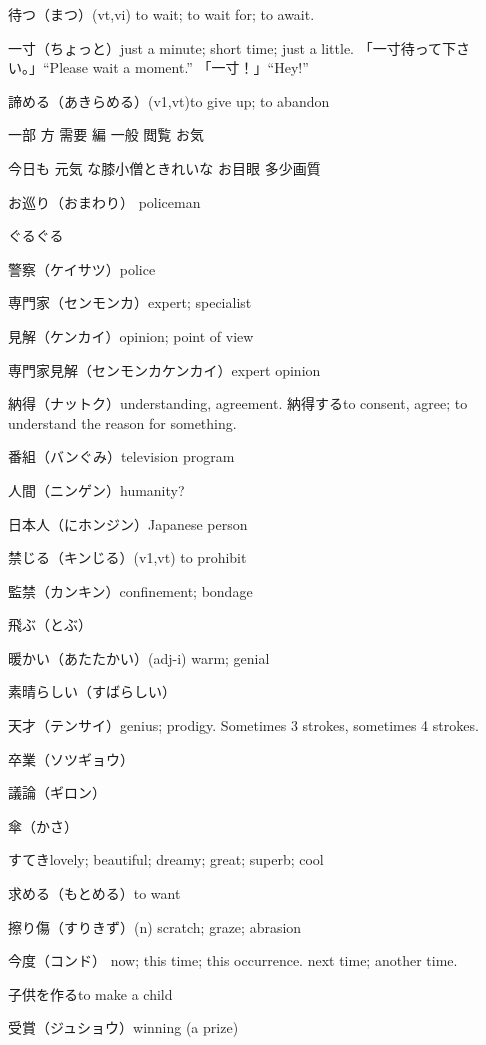 待つ（まつ）(vt,vi) to wait; to wait for; to await.

一寸（ちょっと）just a minute; short time; just a little.
「一寸待って下さい。」``Please wait a moment.''
「一寸！」``Hey!''

諦める（あきらめる）(v1,vt)to give up; to abandon

一部
方
需要
編
一般
閲覧
お気

今日も
元気
な膝小僧ときれいな
お目眼
多少画質

お巡り（おまわり）
policeman

ぐるぐる

警察（ケイサツ）police

専門家（センモンカ）expert; specialist

見解（ケンカイ）opinion; point of view

専門家見解（センモンカケンカイ）expert opinion

納得（ナットク）understanding, agreement.
納得するto consent, agree; to understand the reason for something.

番組（バンぐみ）television program

人間（ニンゲン）humanity?

日本人（にホンジン）Japanese person

禁じる（キンじる）(v1,vt) to prohibit

監禁（カンキン）confinement; bondage


飛ぶ（とぶ）

暖かい（あたたかい）(adj-i) warm; genial

素晴らしい（すばらしい）

天才（テンサイ）genius; prodigy.
Sometimes 3 strokes, sometimes 4 strokes.

卒業（ソツギョウ）

議論（ギロン）

傘（かさ）

すてきlovely; beautiful; dreamy; great; superb; cool

求める（もとめる）to want

擦り傷（すりきず）(n) scratch; graze; abrasion

今度（コンド）
now; this time; this occurrence.
next time; another time.

子供を作るto make a child

受賞（ジュショウ）winning (a prize)


